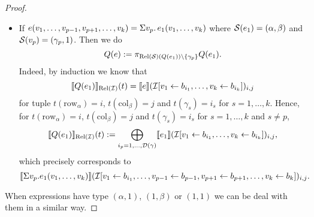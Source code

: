 \begin{proof}
\begin{itemize}
  \item If $e(v_1,\ldots,v_{p-1},v_{p+1},\ldots,v_k)=\Sigma v_p. \, e_1(v_1,\ldots,v_k)$ where $\mathcal{S}(e_1)=(\alpha,\beta)$ and $\mathcal{S}(v_p)=(\gamma_p,1)$. Then we do 
  $$
  Q (e):=\pi_{\text{Rel}(\mathcal{S})(Q(e_1))\setminus\{\gamma_p\}} Q (e_1).
  $$
 Indeed, by induction we know that 
 $$
\llbracket Q(e_1) \rrbracket_{\text{Rel}(\mathcal{I})}(t)=\llbracket e \rrbracket(\mathcal{I}[v_1\gets b_{i_1},\ldots,v_k\gets b_{i_k}])_{i,j}
$$
for tuple $t(\mathrm{row}_\alpha)=i$, $t(\mathrm{col}_\beta)=j$ and $t(\gamma_s)=i_s$ for $s=1,\ldots, k$.
Hence, for $t(\mathrm{row}_\alpha)=i$, $t(\mathrm{col}_\beta)=j$ and $t(\gamma_s)=i_s$ for $s=1,\ldots, k$ and $s\neq p$,
$$
\llbracket Q(e_1) \rrbracket_{\text{Rel}(\mathcal{I})}(t):=\bigoplus_{i_p=1,\ldots,\mathcal{D}(\gamma)} \llbracket e_1 \rrbracket(\mathcal{I}[v_1\gets b_{i_1},\ldots,v_k\gets b_{i_k}])_{i,j},$$
which precisely corresponds to 
$$
\llbracket \Sigma v_p. e_1(v_1,\ldots,v_k) \rrbracket(\mathcal{I}[v_1\gets b_{i_1},\ldots,v_{p-1}\gets b_{p-1},v_{p+1}\gets b_{p+1},\ldots,v_k\gets b_k])_{i,j}.
$$

\end{itemize}
When expressions have type $(\alpha,1)$, $(1,\beta)$ or $(1,1)$ we can be deal with them in a similar way.
\end{proof}

